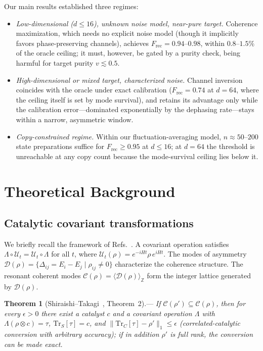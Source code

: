 \documentclass[a4paper,onecolumn]{quantumarticle}
\newcommand{\CC}{\mathcal{C}}
\newcommand{\DD}{\mathcal{D}}
\newcommand{\UU}{\mathcal{U}}
\newcommand{\tr}{\mathrm{Tr}}
\newcommand{\Frec}{F_\mathrm{rec}}
\begin{document}
Our main results established three regimes:
\begin{itemize}
\item \emph{Low-dimensional ($d \leq 16$), unknown noise model, near-pure target.} Coherence maximization, which needs no explicit noise model (though it implicitly favors phase-preserving channels), achieves $\Frec = 0.94$--$0.98$, within $0.8$--$1.5\%$ of the oracle ceiling; it must, however, be gated by a purity check, being harmful for target purity $v \lesssim 0.5$.
\item \emph{High-dimensional or mixed target, characterized noise.} Channel inversion coincides with the oracle under exact calibration ($\Frec = 0.74$ at $d = 64$, where the ceiling itself is set by mode survival), and retains its advantage only while the calibration error---dominated exponentially by the dephasing rate---stays within a narrow, asymmetric window.
\item \emph{Copy-constrained regime.} Within our fluctuation-averaging model, $n \approx 50$--$200$ state preparations suffice for $\Frec \geq 0.95$ at $d \leq 16$; at $d = 64$ the threshold is unreachable at any copy count because the mode-survival ceiling lies below it.
\end{itemize}


\section{Theoretical Background}
\label{sec:theory}

\subsection{Catalytic covariant transformations}
\label{sec:catalytic}

We briefly recall the framework of Refs.~\cite{Shiraishi2024,Wakaura2026unified}.
A covariant operation satisfies $\Lambda \circ \UU_t = \UU_t \circ \Lambda$ for all $t$, where $\UU_t(\rho) = e^{-iHt}\rho\,e^{iHt}$.
The modes of asymmetry $\DD(\rho) = \{\Delta_{ij} = E_i - E_j \mid \rho_{ij} \neq 0\}$ characterize the coherence structure.
The resonant coherent modes $\CC(\rho) = \langle \DD(\rho) \rangle_\mathbb{Z}$ form the integer lattice generated by $\DD(\rho)$.

\noindent\textbf{Theorem 1} (Shiraishi--Takagi~\cite{Shiraishi2024}, Theorem~2).---\textit{%
If $\CC(\rho') \subseteq \CC(\rho)$, then for every $\epsilon > 0$ there exist a catalyst $c$ and a covariant operation $\Lambda$ with $\Lambda(\rho \otimes c) = \tau$, $\tr_S[\tau] = c$, and $\|\tr_C[\tau] - \rho'\|_1 \leq \epsilon$ (correlated-catalytic conversion with arbitrary accuracy); if in addition $\rho'$ is full rank, the conversion can be made exact.}
\end{document}

